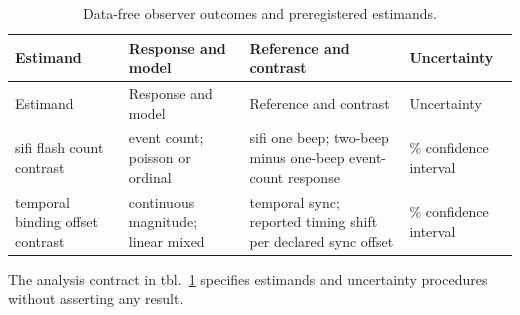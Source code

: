 \documentclass[
  english,
]{article}
\begin{document}
\begin{longtable}[]{@{}
  >{\raggedright\arraybackslash}p{}
  >{\raggedright\arraybackslash}p{}
  >{\raggedright\arraybackslash}p{}
  >{\raggedright\arraybackslash}p{}@{}}
\caption{Data-free observer outcomes and preregistered
estimands.}\label{tbl:observer_estimands}\tabularnewline
\toprule\noalign{}
\begin{minipage}[b]{\linewidth}\raggedright
Estimand
\end{minipage} & \begin{minipage}[b]{\linewidth}\raggedright
Response and model
\end{minipage} & \begin{minipage}[b]{\linewidth}\raggedright
Reference and contrast
\end{minipage} & \begin{minipage}[b]{\linewidth}\raggedright
Uncertainty
\end{minipage} \\
\midrule\noalign{}
\endfirsthead
\toprule\noalign{}
\begin{minipage}[b]{\linewidth}\raggedright
Estimand
\end{minipage} & \begin{minipage}[b]{\linewidth}\raggedright
Response and model
\end{minipage} & \begin{minipage}[b]{\linewidth}\raggedright
Reference and contrast
\end{minipage} & \begin{minipage}[b]{\linewidth}\raggedright
Uncertainty
\end{minipage} \\
\midrule\noalign{}
\endhead
\bottomrule\noalign{}
\endlastfoot
sifi flash count contrast & event count; poisson or ordinal & sifi one
beep; two-beep minus one-beep event-count response & 95\% confidence
interval \\
temporal binding offset contrast & continuous magnitude; linear mixed &
temporal sync; reported timing shift per declared sync offset & 95\%
confidence interval \\
\end{longtable}

The analysis contract in tbl.~\ref{tbl:observer_estimands} specifies
estimands and uncertainty procedures without asserting any result.
\end{document}

